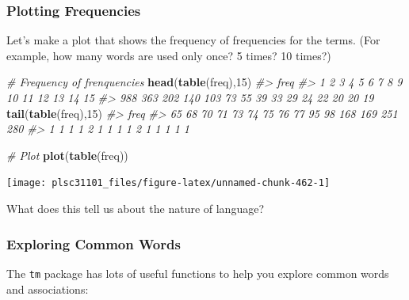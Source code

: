 \documentclass[]{book}
\newenvironment{Shaded}{\begin{snugshade}}{\end{snugshade}}
\newcommand{\KeywordTok}[1]{\textcolor[rgb]{0.13,0.29,0.53}{\textbf{#1}}}
\newcommand{\DecValTok}[1]{\textcolor[rgb]{0.00,0.00,0.81}{#1}}
\newcommand{\CommentTok}[1]{\textcolor[rgb]{0.56,0.35,0.01}{\textit{#1}}}
\newcommand{\NormalTok}[1]{#1}
\begin{document}
\subsubsection*{Plotting Frequencies}\label{plotting-frequencies}

Let's make a plot that shows the frequency of frequencies for the terms.
(For example, how many words are used only once? 5 times? 10 times?)

\begin{Shaded}
\begin{Highlighting}[]
\CommentTok{# Frequency of frenquencies}
\KeywordTok{head}\NormalTok{(}\KeywordTok{table}\NormalTok{(freq),}\DecValTok{15}\NormalTok{)}
\CommentTok{#> freq}
\CommentTok{#>   1   2   3   4   5   6   7   8   9  10  11  12  13  14  15 }
\CommentTok{#> 988 363 202 140 103  73  55  39  33  29  24  22  20  20  19}
\KeywordTok{tail}\NormalTok{(}\KeywordTok{table}\NormalTok{(freq),}\DecValTok{15}\NormalTok{)}
\CommentTok{#> freq}
\CommentTok{#>  65  68  70  71  73  74  75  76  77  95  98 168 169 251 280 }
\CommentTok{#>   1   1   1   1   2   1   1   1   1   2   1   1   1   1   1}

\CommentTok{# Plot}
\KeywordTok{plot}\NormalTok{(}\KeywordTok{table}\NormalTok{(freq))}
\end{Highlighting}
\end{Shaded}

\begin{center}\texttt{[image: plsc31101\_files/figure-latex/unnamed-chunk-462-1]} \end{center}

What does this tell us about the nature of language?

\subsubsection*{Exploring Common Words}\label{exploring-common-words}

The \texttt{tm} package has lots of useful functions to help you explore
common words and associations:
\end{document}

